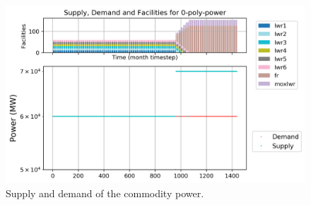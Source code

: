 \documentclass[11pt]{article}
\begin{document}
\begin{figure}[H]
	\centering
	\includegraphics[width=\textwidth]{29-figures/0-poly-power.png} 
	\hfill
	\caption{Supply and demand of the commodity power.}
	\label{fig:29-power}
\end{figure}
\end{document}
